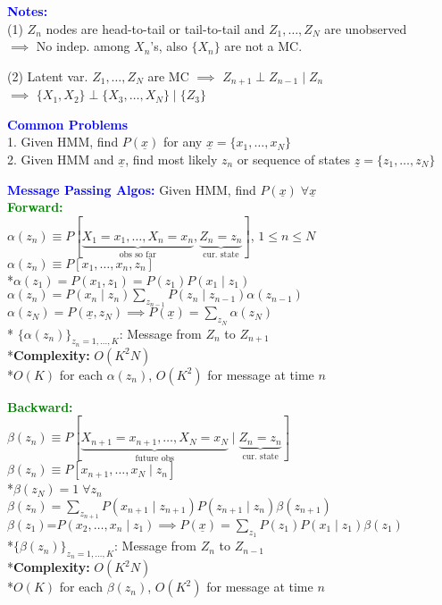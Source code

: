 \documentclass[5pt]{extarticle} %
\begin{document}
\begin{paracol}{3}
{    \textcolor{blue}{\textbf{Notes:}} \\
    (1) $Z_n$ nodes are head-to-tail or tail-to-tail and $Z_1,\ldots,Z_N$ are unobserved\\
    $\implies$ No indep. among $X_n$'s, also $\{X_n\}$ are not a MC.

    (2) Latent var. $Z_1,\ldots,Z_N$ are MC $\implies$ $Z_{n+1} \perp Z_{n-1} \mid Z_n$ \\
    $\implies$ $\{X_1,X_2\} \perp \{X_3,\ldots,X_N\} \mid \{Z_3\}$

    \textcolor{blue}{\textbf{Common Problems}} \\ 
    1. Given HMM, find $P(\underline{x})$ for any $\underline{x} = \{x_1,\ldots,x_N\}$ \\
    2. Given HMM and $\underline{x}$, find most likely $z_n$ or sequence of states $\underline{z} = \{z_1,\ldots,z_N\}$ 

    \textcolor{blue}{\textbf{Message Passing Algos:}} Given HMM, find $P(\underline{x}) \; \forall \underline{x}$ \\
    \textcolor{green}{\textbf{Forward:}} \\
    $\alpha(z_n) \equiv P[\underbrace{X_1 = x_1,\ldots,X_n=x_n}_{\text{obs so far}}, \underbrace{Z_n = z_n}_{\text{cur. state}}]$, $1 \leq n \leq N$\\
    $\alpha(z_n) \equiv P[x_1,\ldots,x_n,z_n]$ \\
    *$\alpha(z_1) = P(x_1,z_1) = P(z_1)P(x_1 \mid z_1)$ \\
    $\boxed{\alpha(z_n) = P(x_n \mid z_n) \sum_{z_{n-1}} P(z_n \mid z_{n-1}) \alpha(z_{n-1})}$ \\
    $\boxed{\alpha(z_N) = P(\underline{x}, z_N) \implies P(\underline{x}) = \sum_{z_N} \alpha(z_N)}$ \\
    * $\{\alpha(z_n)\}_{z_n = 1,\ldots,K}$: Message from $Z_n$ to $Z_{n+1}$ \\
    *\textbf{Complexity:} $O(K^2 N)$ \\
    *$O(K)$ for each $\alpha(z_n)$, $O(K^2)$ for message at time $n$

    \textcolor{green}{\textbf{Backward:}} \\
    $\beta(z_n) \equiv P[\underbrace{X_{n+1} = x_{n+1},\ldots,X_N=x_N}_{\text{future obs}} \mid \underbrace{Z_n = z_n}_{\text{cur. state}}]$ \\
    $\beta(z_n) \equiv P[x_{n+1},\ldots,x_N \mid z_n]$ \\
    *$\beta(z_N) = 1 \; \forall z_n$ \\
    $\boxed{\beta(z_n) = \sum_{z_{n+1}} P(x_{n+1} \mid z_{n+1}) P(z_{n+1} \mid z_n) \beta(z_{n+1})}$ \\
    $\boxed{\beta(z_1) \text{=} P(x_2,\ldots,x_n \mid z_1) \implies P(\underline{x}) = \sum_{z_1} P(z_1) P(x_1 \mid z_1) \beta(z_1)}$ \\
    *$\{\beta(z_n)\}_{z_n = 1,\ldots,K}$: Message from $Z_n$ to $Z_{n-1}$ \\
    *\textbf{Complexity:} $O(K^2 N)$ \\
    *$O(K)$ for each $\beta(z_n)$, $O(K^2)$ for message at time $n$

}
\end{paracol}
\end{document}
